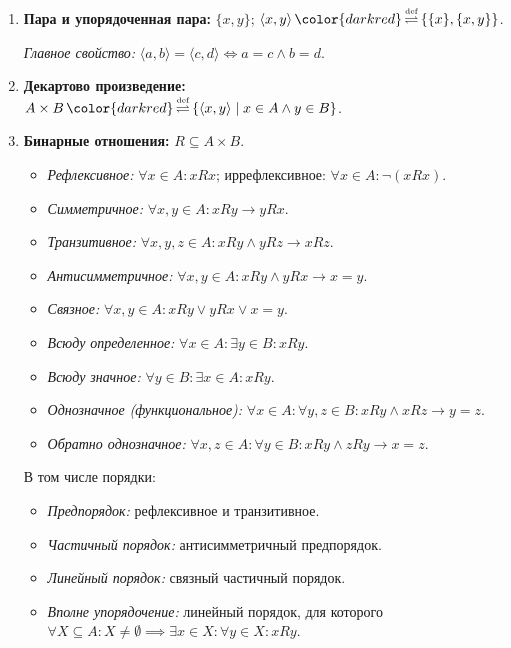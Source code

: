 \documentclass[11pt, a4paper]{extarticle}
\renewcommand{\eqdef}{\ifmmode{\,\color{darkred}\mathop{\overset{\text{\tiny def}}{\rightleftharpoons}}\,}\fi}%
\newcommand{\eqdef}{\,\mathop{\color{darkred}\overset{\text{\tiny def}}{\rightleftharpoons}}\,}
\begin{document}
\begin{definition}
\begin{enumerate}
\item \textbf{Пара и упорядоченная пара:} $\{x,y\}$; $\langle x, y \rangle \eqdef \{\{x\}, \{x, y\}\}$. 

\textit{Главное свойство:} $\langle a, b \rangle = \langle c, d \rangle \iff a=c \land b=d$.
        
\item \textbf{Декартово произведение:} $A \times B \eqdef \{\langle x, y \rangle \mid x \in A \land y \in B\}$.
        
\item \textbf{Бинарные отношения:} $R \subseteq A \times B$.
\begin{itemize}
    \item \textit{Рефлексивное:} $\forall x \in A: xRx$; иррефлексивное: $\forall x \in A: \neg(xRx)$.
    \item \textit{Симметричное:} $\forall x,y \in A: xRy \to yRx$.
    \item \textit{Транзитивное:} $\forall x,y,z \in A: xRy \land yRz \to xRz$.
    \item \textit{Антисимметричное:} $\forall x,y \in A: xRy \land yRx \to x=y$.
    \item \textit{Связное:} $\forall x,y \in A: xRy \lor yRx \lor x=y$.
    \item \textit{Всюду определенное:} $\forall x\in A:\exists y\in B:xRy$.
    \item \textit{Всюду значное:} $\forall y\in B:\exists x\in A:xRy$.
    \item \textit{Однозначное (функциональное):} $\forall x\in A:\forall y,z\in B:xRy\land xRz\to y=z$.
    \item \textit{Обратно однозначное:} $\forall x,z\in A:\forall y\in B:xRy\land zRy\to x=z$.    
\end{itemize}

В том числе порядки:
\begin{itemize}
    \item \textit{Предпорядок:} рефлексивное и транзитивное.
    \item \textit{Частичный порядок:} антисимметричный предпорядок.
    \item \textit{Линейный порядок:} связный частичный порядок.
    \item \textit{Вполне упорядочение:} линейный порядок, для которого $\forall X \subseteq A: X \neq \emptyset \implies \exists x \in X: \forall y \in X: xRy$.
\end{itemize}


\end{enumerate}
\end{definition}
\end{document}
